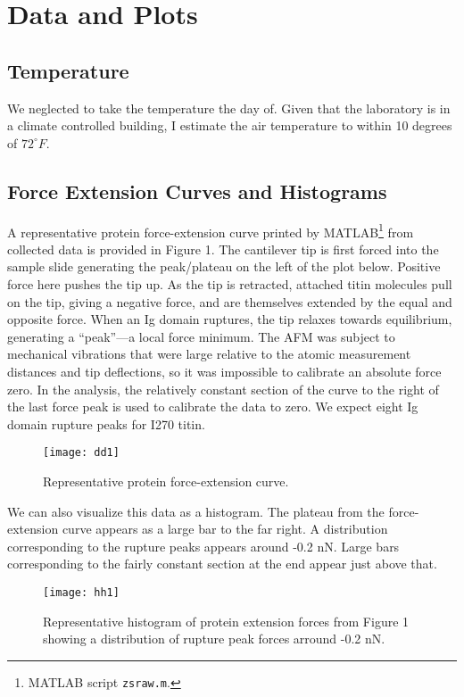 \documentclass{article}
\begin{document}
\section{Data and Plots}

\subsection{Temperature}

We neglected to take the temperature the day of. Given that the laboratory is in a climate
controlled building, I estimate the air temperature to within 10 degrees of $72^\circ F$.

\subsection{Force Extension Curves and Histograms}

A representative protein force-extension curve printed by
MATLAB\footnote{MATLAB script \texttt{zs\textunderscore raw.m}.} from collected data is
provided in Figure 1.
The cantilever tip is first forced into the sample slide generating the peak/plateau
on the left of the plot below. Positive force here pushes the tip up. As the tip is retracted,
attached titin molecules pull on the tip, giving a negative force, and are themselves
extended by the equal and opposite force.
When an Ig domain ruptures, the tip relaxes towards equilibrium, generating a
``peak''---a local force minimum.
The AFM was subject to mechanical vibrations that were large relative to the atomic
measurement distances and tip deflections, so it was impossible to calibrate an absolute
force zero. In the analysis, the relatively constant section of the curve to the right of the
last force peak is used to calibrate the data to zero. We expect eight Ig domain rupture
peaks for I270 titin.

\begin{figure}[H]
\texttt{[image: dd1]}
\centering
\caption{Representative protein force-extension curve.}
\end{figure}

We can also visualize this data as a histogram. The plateau from the force-extension curve
appears as a large bar to the far right. A distribution corresponding to the rupture peaks 
appears around -0.2 nN. Large bars corresponding to the fairly constant section at the
end appear just above that.

\begin{figure}[H]
\texttt{[image: hh1]}
\centering
\caption{Representative histogram of protein extension forces from Figure 1 showing a
distribution of rupture peak forces arround -0.2 nN.}
\end{figure}
\end{document}
